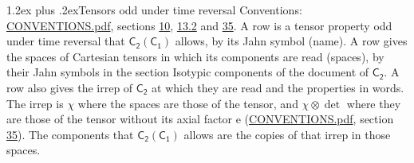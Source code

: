 \documentclass[10pt,a4paper]{article}
\makeatletter
\renewcommand\section{\@startsection{section}{1}{\z@}{-3ex plus -1ex minus -.2ex}%
  {1.2ex plus .2ex}{\normalfont\large\sffamily\bfseries\color{parttitle}}}
\numberwithin{equation}{section}
\newcommand{\grp}[1]{\mathsf{#1}}
\newcommand{\irrprod}{\otimes}
\makeatother
\begin{document}
\section{Tensors odd under time reversal}\label{s:time_odd}
Conventions: \href{../../CONVENTIONS.pdf}{CONVENTIONS.pdf}, sections \href{../../../rotation/CONVENTIONS.pdf\#conv.10}{10}, \href{../../../rotation/CONVENTIONS.pdf\#conv.13.2}{13.2} and \href{../../CONVENTIONS.pdf\#conv.35}{35}.
\leavevmode\label{n:head.name.property}A row is a tensor property odd under time reversal that $\grp{C_{2}}(\grp{C_{1}})$ allows, by its Jahn symbol (name). \label{n:head.spaces}A row gives the spaces of Cartesian tensors in which its components are read (spaces), by their Jahn symbols in the section Isotypic components of the document of \href{../../../rotation/data/pdf/C2.pdf}{$\grp{C_{2}}$}. \label{n:head.properties}A row also gives the irrep of $\grp{C_{2}}$ at which they are read and the properties in words. The irrep is $\chi$ where the spaces are those of the tensor, and $\chi \irrprod \det$ where they are those of the tensor without its axial factor e (\href{../../CONVENTIONS.pdf}{CONVENTIONS.pdf}, section \href{../../CONVENTIONS.pdf\#conv.35}{35}). The components that $\grp{C_{2}}(\grp{C_{1}})$ allows are the copies of that irrep in those spaces.
\end{document}
